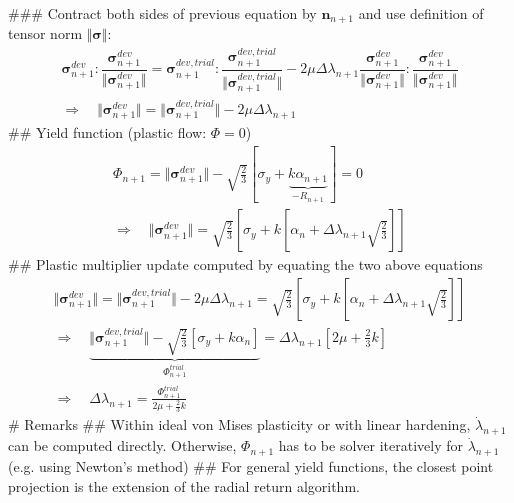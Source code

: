 \documentclass[]{scrartcl}
\begin{document}
\begin{easylist}
\begin{gather*}
\end{gather*}
### Contract both sides of previous equation by $\boldsymbol{n}_{n+1}$ and use definition of tensor norm $\Vert \boldsymbol{\sigma} \Vert$:
\begin{gather*}
\boldsymbol{\sigma}^{dev}_{n+1} : \dfrac{\boldsymbol{\sigma}^{dev}_{n+1}}{\Vert \boldsymbol{\sigma}^{dev}_{n+1} \Vert}
  = \boldsymbol{\sigma}^{dev, trial}_{n+1} : \dfrac{\boldsymbol{\sigma}^{dev, trial}_{n+1}}{\Vert \boldsymbol{\sigma}^{dev, trial}_{n+1} \Vert}
  - 2 \mu \Delta \lambda_{n+1} \dfrac{\boldsymbol{\sigma}^{dev}_{n+1}}{\Vert \boldsymbol{\sigma}^{dev}_{n+1} \Vert} : \dfrac{\boldsymbol{\sigma}^{dev}_{n+1}}{\Vert \boldsymbol{\sigma}^{dev}_{n+1} \Vert} \\
\Rightarrow \quad
\Vert \boldsymbol{\sigma}^{dev}_{n+1} \Vert
  = \Vert \boldsymbol{\sigma}^{dev, trial}_{n+1} \Vert
  - 2 \mu \Delta \lambda_{n+1}
\end{gather*}
## Yield function (plastic flow: $\Phi = 0$)
\begin{gather*}
\Phi_{n+1}
  = \Vert \boldsymbol{\sigma}^{dev}_{n+1} \Vert - \sqrt{\frac{2}{3}} \left[ \sigma_{y} + \underbrace{k \alpha_{n+1}}_{- R_{n+1}} \right]
  = 0 \\
\Rightarrow \quad
\Vert \boldsymbol{\sigma}^{dev}_{n+1} \Vert
  = \sqrt{\frac{2}{3}} \left[ \sigma_{y} + k \left[ \alpha_{n} + \Delta \lambda_{n+1} \sqrt{\frac{2}{3}} \right] \right]
\end{gather*}
## Plastic multiplier update computed by equating the two above equations
\begin{gather*}
\Vert \boldsymbol{\sigma}^{dev}_{n+1} \Vert
  = \Vert \boldsymbol{\sigma}^{dev, trial}_{n+1} \Vert
  - 2 \mu \Delta \lambda_{n+1}
  = \sqrt{\frac{2}{3}} \left[ \sigma_{y} + k \left[ \alpha_{n} + \Delta \lambda_{n+1} \sqrt{\frac{2}{3}} \right] \right] \\
\Rightarrow \quad
\underbrace{\Vert \boldsymbol{\sigma}^{dev, trial}_{n+1} \Vert - \sqrt{\frac{2}{3}} \left[ \sigma_{y} + k \alpha_{n} \right]}_{\Phi^{trial}_{n+1}}
  = \Delta \lambda_{n+1} \left[ 2 \mu + \frac{2}{3} k \right] \\
\Rightarrow \quad
\Delta \lambda_{n+1}
  = \frac{\Phi^{trial}_{n+1}}{2 \mu + \frac{2}{3} k}
\end{gather*}
# Remarks
## Within ideal von Mises plasticity or with linear hardening, $\dot{\lambda}_{n+1}$ can be computed directly.
   Otherwise, $\Phi_{n+1}$ has to be solver iteratively for $\dot{\lambda}_{n+1}$ (e.g. using Newton's method)
## For general yield functions, the closest point projection is the extension of the radial return algorithm.
\end{easylist}
\end{document}
